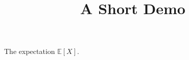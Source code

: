 \documentclass[article]{jss}
\title{A Short Demo}
\begin{document}
The expectation $\mathbb{E}[X]$.
\end{document}
